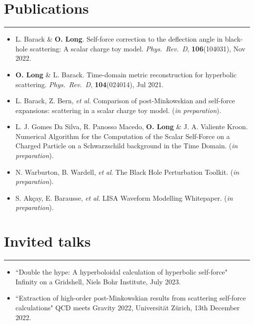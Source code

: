 \documentclass[10.5pt, oneside]{article}   	%
\begin{document}
{\color{Sectioncolour}
\section*{Publications}
\vspace{-3mm}
\noindent\rule{\linewidth}{0.6pt}}
\begin{itemize}
\item L. Barack \& {\bf O. Long}. Self-force correction to the deflection angle in black-hole scattering: A scalar charge toy model. {\it Phys.\ Rev.\ D}, {\bf 106}(104031), Nov 2022. \href{https://journals.aps.org/prd/abstract/10.1103/PhysRevD.106.104031}{}
\item {\bf O. Long} \& L. Barack. Time-domain metric reconstruction for hyperbolic scattering. {\it Phys.\ Rev.\ D}, {\bf 104}(024014), Jul 2021. \href{https://journals.aps.org/prd/abstract/10.1103/PhysRevD.104.024014}
{}
\item L. Barack, Z. Bern, {\it et al}. Comparison of post-Minkowskian and self-force expansions: scattering in a scalar charge toy model.  ({\it in preparation}).
\item L. J. Gomes Da Silva, R. Panosso Macedo, {\bf O. Long} \& J. A. Valiente Kroon. Numerical Algorithm for the Computation of the Scalar Self-Force on a Charged Particle on a Schwarzschild background in the Time Domain. ({\it in preparation}).
\item N. Warburton, B. Wardell, {\it et al}. The Black Hole Perturbation Toolkit. ({\it in preparation}).
\item S. Akçay, E. Barausse, {\it et al}. LISA Waveform Modelling Whitepaper. ({\it in preparation}).
\end{itemize} 

 
  {\color{Sectioncolour}
\section*{Invited talks}
\vspace{-3mm}
\noindent\rule{\linewidth}{0.6pt}}
\begin{itemize}
\item``Double the hype: A hyperboloidal calculation of hyperbolic self-force" Infinity on a Gridshell, Niels Bohr Institute, July 2023.
\item``Extraction of high-order post-Minkowskian results from scattering self-force calculations" QCD meets Gravity 2022, Universität Zürich, 13th December 2022.
\end{itemize} 
 
\end{document}
